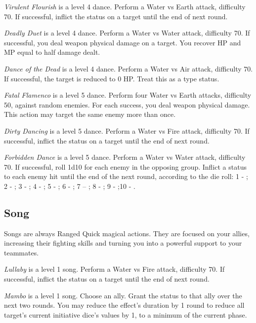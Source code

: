 \begin{multicols}{2}
    \textit{Virulent Flourish} is a level 4 dance. Perform a Water vs Earth attack, difficulty 70. If successful, inflict the  status on a target until the end of next round.
    
    \textit{Deadly Duet} is a level 4 dance. Perform a Water vs Water attack, difficulty 70. If successful, you deal weapon physical damage on a target. You recover HP and MP equal to half damage dealt.
    
    \textit{Dance of the Dead} is a level 4 dance. Perform a Water vs Air attack, difficulty 70. If successful, the target is reduced to 0 HP. Treat this as a  type status.
    
    \textit{Fatal Flamenco} is a level 5 dance. Perform four Water vs Earth attacks, difficulty 50, against random enemies. For each success, you deal weapon physical damage. This action may target the same enemy more than once.
    
    \textit{Dirty Dancing} is a level 5 dance. Perform a Water vs Fire attack, difficulty 70. If successful, inflict the  status on a target until the end of next round.
    
	\textit{Forbidden Dance} is a level 5 dance. Perform a Water vs Water attack, difficulty 70. If successful, roll 1d10 for each enemy in the opposing group. Inflict a status to each enemy hit until the end of the next round, according to the die roll: 1 - ; 2 - ; 3 - ; 4 - ; 5 - ; 6 - ; 7 – ; 8 - ; 9 -  ;10 - .

    \subsection{Song}\label{subsec:perf-song}

    Songs are always Ranged Quick magical actions. They are focused on your allies, increasing their fighting skills and turning you into a powerful support to your teammates.
    
    \textit{Lullaby} is a level 1 song. Perform a Water vs Fire attack, difficulty 70. If successful, inflict the  status on a target until the end of next round.
    
    \textit{Mambo} is a level 1 song. Choose an ally. Grant the  status to that ally over the next two rounds. You may reduce the effect's duration by 1 round to reduce all target's current initiative dice's values by 1, to a minimum of the current phase.
    

\end{multicols}
